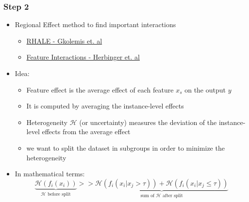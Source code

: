 \documentclass{beamer}
\begin{document}
\begin{frame}
  \frametitle{Step 2}
  \begin{itemize}
  \item Regional Effect method to find important interactions
    \begin{itemize}
    \item \href{https://givasile.github.io/assets/pdf/gkolemis23_rhale.pdf}{RHALE - Gkolemis et. al}
    \item \href{https://arxiv.org/pdf/2306.00541.pdf}{Feature Interactions - Herbinger et. al}
    \end{itemize}
  \item Idea:
    \begin{itemize}
    \item Feature effect is the average effect of each feature $x_s$ on the output $y$
    \item It is computed by averaging the instance-level effects
    \item Heterogeneity $\mathcal{H}$ (or uncertainty) measures the deviation of the instance-level effects from the average effect
    \item we want to split the dataset in subgroups in order to minimize the heterogeneity
    \end{itemize}
  \item In mathematical terms:
    \[\underbrace{\mathcal{H}(f_i(x_i))}_{\mathcal{H}\text{ before split}} >> \underbrace{\mathcal{H}(f_i(x_i | x_j > \tau)) + \mathcal{H}(f_i(x_i | x_j \leq \tau))}_{\text{sum of } \mathcal{H} \text{ after split}}\]
  \end{itemize}
\end{frame}
\end{document}

